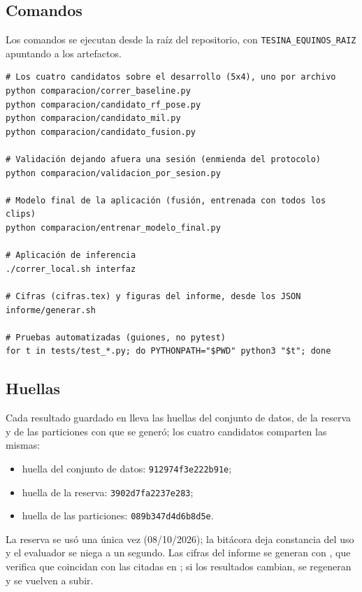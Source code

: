 \subsection{Comandos}
Los comandos se ejecutan desde la raíz del repositorio, con \texttt{TESINA\_EQUINOS\_RAIZ} apuntando a los artefactos.
{\singlespacing\small
\begin{verbatim}
# Los cuatro candidatos sobre el desarrollo (5x4), uno por archivo
python comparacion/correr_baseline.py
python comparacion/candidato_rf_pose.py
python comparacion/candidato_mil.py
python comparacion/candidato_fusion.py

# Validación dejando afuera una sesión (enmienda del protocolo)
python comparacion/validacion_por_sesion.py

# Modelo final de la aplicación (fusión, entrenada con todos los clips)
python comparacion/entrenar_modelo_final.py

# Aplicación de inferencia
./correr_local.sh interfaz

# Cifras (cifras.tex) y figuras del informe, desde los JSON
informe/generar.sh

# Pruebas automatizadas (guiones, no pytest)
for t in tests/test_*.py; do PYTHONPATH="$PWD" python3 "$t"; done
\end{verbatim}}

\subsection{Huellas}
Cada resultado guardado en  lleva las huellas del conjunto de datos, de la reserva y de las particiones con que se generó; los cuatro candidatos comparten las mismas:

\begin{itemize}
  \item huella del conjunto de datos: \texttt{912974f3e222b91e};
  \item huella de la reserva: \texttt{3902d7fa2237e283};
  \item huella de las particiones: \texttt{089b347d4d6b8d5e}.
\end{itemize}

La reserva se usó una única vez (08/10/2026); la bitácora  deja constancia del uso y el evaluador se niega a un segundo. Las cifras del informe se generan con , que verifica que coincidan con las citadas en ; si los resultados cambian, se regeneran y se vuelven a subir.
